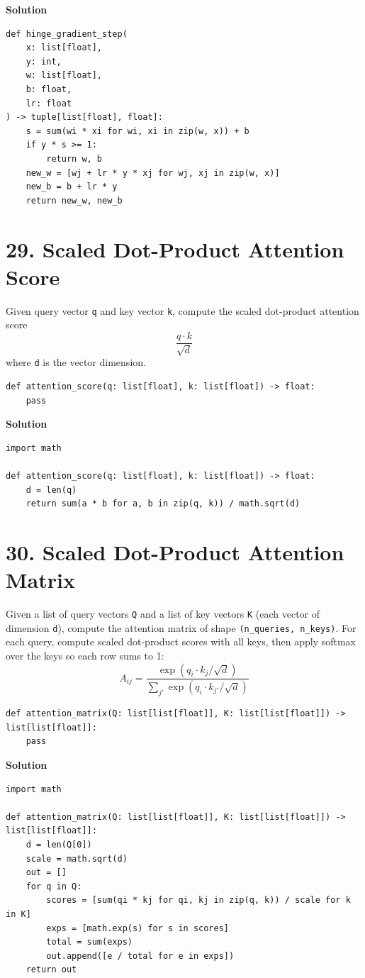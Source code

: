 \documentclass[11pt]{article}
\begin{document}
\medskip
\noindent\textbf{Solution}
\begin{lstlisting}
def hinge_gradient_step(
    x: list[float],
    y: int,
    w: list[float],
    b: float,
    lr: float
) -> tuple[list[float], float]:
    s = sum(wi * xi for wi, xi in zip(w, x)) + b
    if y * s >= 1:
        return w, b
    new_w = [wj + lr * y * xj for wj, xj in zip(w, x)]
    new_b = b + lr * y
    return new_w, new_b
\end{lstlisting}

\section*{29. Scaled Dot-Product Attention Score}
Given query vector \texttt{q} and key vector \texttt{k}, compute the scaled dot-product attention score
\[
\frac{q \cdot k}{\sqrt{d}}
\]
where \texttt{d} is the vector dimension.

\begin{lstlisting}
def attention_score(q: list[float], k: list[float]) -> float:
    pass
\end{lstlisting}

\medskip
\noindent\textbf{Solution}
\begin{lstlisting}
import math

def attention_score(q: list[float], k: list[float]) -> float:
    d = len(q)
    return sum(a * b for a, b in zip(q, k)) / math.sqrt(d)
\end{lstlisting}

\section*{30. Scaled Dot-Product Attention Matrix}
Given a list of query vectors \texttt{Q} and a list of key vectors \texttt{K} (each vector of dimension \texttt{d}), compute the attention matrix of shape \texttt{(n\_queries, n\_keys)}. For each query, compute scaled dot-product scores with all keys, then apply softmax over the keys so each row sums to 1:
\[
A_{ij} = \frac{\exp(q_i \cdot k_j / \sqrt{d})}{\sum_{j'} \exp(q_i \cdot k_{j'} / \sqrt{d})}
\]

\begin{lstlisting}
def attention_matrix(Q: list[list[float]], K: list[list[float]]) -> list[list[float]]:
    pass
\end{lstlisting}

\medskip
\noindent\textbf{Solution}
\begin{lstlisting}
import math

def attention_matrix(Q: list[list[float]], K: list[list[float]]) -> list[list[float]]:
    d = len(Q[0])
    scale = math.sqrt(d)
    out = []
    for q in Q:
        scores = [sum(qi * kj for qi, kj in zip(q, k)) / scale for k in K]
        exps = [math.exp(s) for s in scores]
        total = sum(exps)
        out.append([e / total for e in exps])
    return out
\end{lstlisting}
\end{document}
